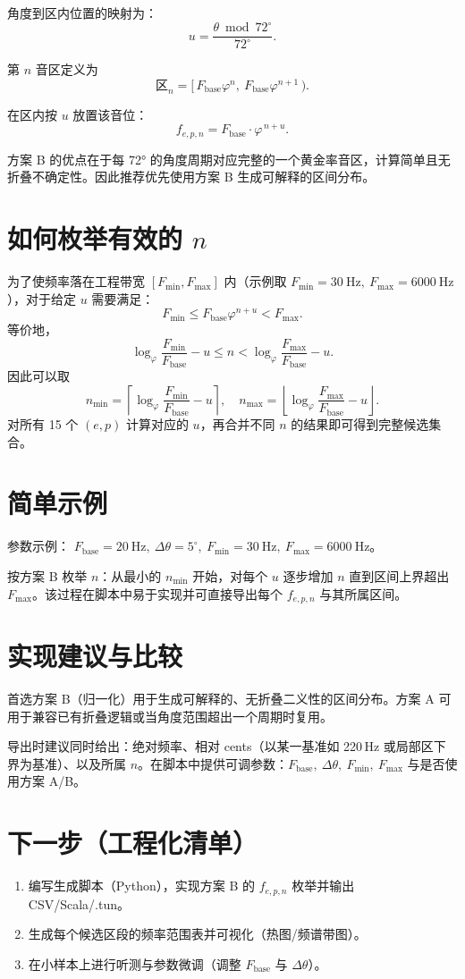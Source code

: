 \documentclass{article}
\begin{document}
角度到区内位置的映射为：
\[
u=\frac{\theta \bmod 72^\circ}{72^\circ}.
\]

第 \(n\) 音区定义为
\[
\text{区}_n=[\,F_{\mathrm{base}}\varphi^{n},\ F_{\mathrm{base}}\varphi^{n+1}\,).
\]

在区内按 \(u\) 放置该音位：
\[
f_{e,p,n} = F_{\mathrm{base}}\cdot \varphi^{\,n+u}.
\]

方案 B 的优点在于每 72° 的角度周期对应完整的一个黄金率音区，计算简单且无折叠不确定性。因此推荐优先使用方案 B 生成可解释的区间分布。

\section*{如何枚举有效的 \(n\)}
为了使频率落在工程带宽 \([F_{\min},F_{\max}]\) 内（示例取 \(F_{\min}=30\ \mathrm{Hz},\ F_{\max}=6000\ \mathrm{Hz}\)），对于给定 \(u\) 需要满足：
\[
F_{\min}\le F_{\mathrm{base}}\varphi^{n+u}<F_{\max}.
\]
等价地，
\[
\log_{\varphi}\frac{F_{\min}}{F_{\mathrm{base}}}-u \le n < \log_{\varphi}\frac{F_{\max}}{F_{\mathrm{base}}}-u.
\]
因此可以取
\[
n_{\min}=\left\lceil \log_{\varphi}\frac{F_{\min}}{F_{\mathrm{base}}}-u \right\rceil,\quad
n_{\max}=\left\lfloor \log_{\varphi}\frac{F_{\max}}{F_{\mathrm{base}}}-u \right\rfloor.
\]
对所有 15 个 \((e,p)\) 计算对应的 \(u\)，再合并不同 \(n\) 的结果即可得到完整候选集合。

\section*{简单示例}
参数示例： \(F_{\mathrm{base}}=20\ \mathrm{Hz},\ \Delta\theta=5^\circ,\ F_{\min}=30\ \mathrm{Hz},\ F_{\max}=6000\ \mathrm{Hz}\)。

按方案 B 枚举 \(n\)：从最小的 \(n_{\min}\) 开始，对每个 \(u\) 逐步增加 \(n\) 直到区间上界超出 \(F_{\max}\)。该过程在脚本中易于实现并可直接导出每个 \(f_{e,p,n}\) 与其所属区间。

\section*{实现建议与比较}
首选方案 B（归一化）用于生成可解释的、无折叠二义性的区间分布。方案 A 可用于兼容已有折叠逻辑或当角度范围超出一个周期时复用。

导出时建议同时给出：绝对频率、相对 cents（以某一基准如 220\,Hz 或局部区下界为基准）、以及所属 \(n\)。在脚本中提供可调参数：\(F_{\mathrm{base}},\ \Delta\theta,\ F_{\min},\ F_{\max}\) 与是否使用方案 A/B。

\section*{下一步（工程化清单）}
\begin{enumerate}
  \item 编写生成脚本（Python），实现方案 B 的 \(f_{e,p,n}\) 枚举并输出 CSV/Scala/.tun。
  \item 生成每个候选区段的频率范围表并可视化（热图/频谱带图）。
  \item 在小样本上进行听测与参数微调（调整 \(F_{\mathrm{base}}\) 与 \(\Delta\theta\)）。
\end{enumerate}
\end{document}
